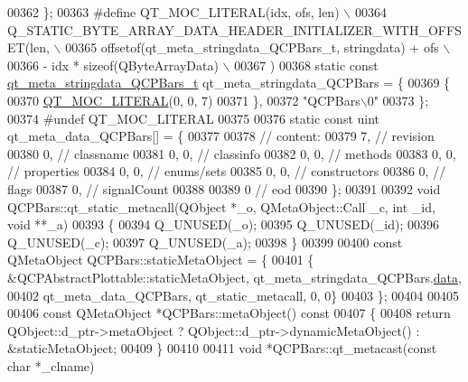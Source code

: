 \begin{DoxyCode}
00362 \};
00363 \textcolor{preprocessor}{#define QT\_MOC\_LITERAL(idx, ofs, len) \(\backslash\)}
00364 \textcolor{preprocessor}{    Q\_STATIC\_BYTE\_ARRAY\_DATA\_HEADER\_INITIALIZER\_WITH\_OFFSET(len, \(\backslash\)}
00365 \textcolor{preprocessor}{    offsetof(qt\_meta\_stringdata\_QCPBars\_t, stringdata) + ofs \(\backslash\)}
00366 \textcolor{preprocessor}{        - idx * sizeof(QByteArrayData) \(\backslash\)}
00367 \textcolor{preprocessor}{    )}
00368 \textcolor{keyword}{static} \textcolor{keyword}{const} \hyperlink{a00016_d4/d3a/a00101}{qt\_meta\_stringdata\_QCPBars\_t} qt\_meta\_stringdata\_QCPBars = \{
00369     \{
00370 \hyperlink{a00016_a75bb9482d242cde0a06c9dbdc6b83abe}{QT\_MOC\_LITERAL}(0, 0, 7)
00371     \},
00372     \textcolor{stringliteral}{"QCPBars\(\backslash\)0"}
00373 \};
00374 \textcolor{preprocessor}{#undef QT\_MOC\_LITERAL}
00375 
00376 \textcolor{keyword}{static} \textcolor{keyword}{const} uint qt\_meta\_data\_QCPBars[] = \{
00377 
00378  \textcolor{comment}{// content:}
00379        7,       \textcolor{comment}{// revision}
00380        0,       \textcolor{comment}{// classname}
00381        0,    0, \textcolor{comment}{// classinfo}
00382        0,    0, \textcolor{comment}{// methods}
00383        0,    0, \textcolor{comment}{// properties}
00384        0,    0, \textcolor{comment}{// enums/sets}
00385        0,    0, \textcolor{comment}{// constructors}
00386        0,       \textcolor{comment}{// flags}
00387        0,       \textcolor{comment}{// signalCount}
00388 
00389        0        \textcolor{comment}{// eod}
00390 \};
00391 
00392 \textcolor{keywordtype}{void} QCPBars::qt\_static\_metacall(QObject *\_o, QMetaObject::Call \_c, \textcolor{keywordtype}{int} \_id, \textcolor{keywordtype}{void} **\_a)
00393 \{
00394     Q\_UNUSED(\_o);
00395     Q\_UNUSED(\_id);
00396     Q\_UNUSED(\_c);
00397     Q\_UNUSED(\_a);
00398 \}
00399 
00400 \textcolor{keyword}{const} QMetaObject QCPBars::staticMetaObject = \{
00401     \{ &QCPAbstractPlottable::staticMetaObject, qt\_meta\_stringdata\_QCPBars.\hyperlink{a00016_a5237dfd2ea3d5be916ce7c562d734ff4}{data},
00402       qt\_meta\_data\_QCPBars,  qt\_static\_metacall, 0, 0\}
00403 \};
00404 
00405 
00406 \textcolor{keyword}{const} QMetaObject *QCPBars::metaObject()\textcolor{keyword}{ const}
00407 \textcolor{keyword}{}\{
00408     \textcolor{keywordflow}{return} QObject::d\_ptr->metaObject ? QObject::d\_ptr->dynamicMetaObject() : &staticMetaObject;
00409 \}
00410 
00411 \textcolor{keywordtype}{void} *QCPBars::qt\_metacast(\textcolor{keyword}{const} \textcolor{keywordtype}{char} *\_clname)

\end{DoxyCode}
